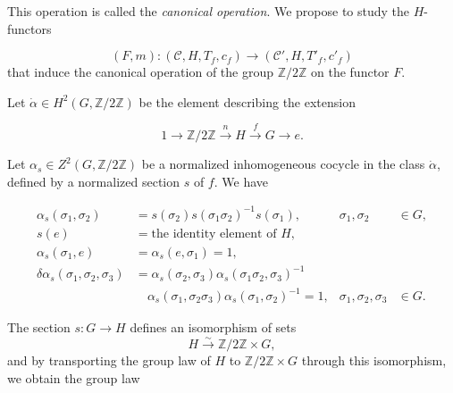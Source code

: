 %
This operation is called the \emph{canonical operation}. We propose to
study the $H$-functors

\begin{equation}
  (F,m)\colon(\mathcal C,H,T_f,c_f)
  \longrightarrow(\mathcal C',H,T'_f,c'_f)
  \tag{1.4.3.3}
\end{equation}
that induce the canonical operation of the group
$\mathbb Z/2\mathbb Z$ on the functor $F$.

Let $\dot\alpha\in H^2(G,\mathbb Z/2\mathbb Z)$ be the element
describing the extension

\begin{equation}
  1\longrightarrow\mathbb Z/2\mathbb Z
  \xrightarrow{n}H\xrightarrow{f}G\longrightarrow e.
  \tag{1.4.3.4}
\end{equation}

Let $\alpha_s\in Z^2(G,\mathbb Z/2\mathbb Z)$ be a normalized
inhomogeneous cocycle in the class $\dot\alpha$, defined by a normalized
section $s$ of $f$. We have

\begin{equation}
  \begin{aligned}
    \alpha_s(\sigma_1,\sigma_2)
      &=s(\sigma_2)s(\sigma_1\sigma_2)^{-1}s(\sigma_1),
      & \sigma_1,\sigma_2&\in G,\\
    s(e)&=\text{the identity element of }H,\\
    \alpha_s(\sigma_1,e)&=\alpha_s(e,\sigma_1)=1,\\
    \delta\alpha_s(\sigma_1,\sigma_2,\sigma_3)
      &=\alpha_s(\sigma_2,\sigma_3)
        \alpha_s(\sigma_1\sigma_2,\sigma_3)^{-1}\\
      &\quad{}\alpha_s(\sigma_1,\sigma_2\sigma_3)
        \alpha_s(\sigma_1,\sigma_2)^{-1}=1,
      & \sigma_1,\sigma_2,\sigma_3&\in G.
  \end{aligned}
  \tag{1.4.3.5}
\end{equation}

The section $s\colon G\to H$ defines an isomorphism of sets
\[
  H\xrightarrow{\sim}\mathbb Z/2\mathbb Z\times G,
\]
and by transporting the group law of $H$ to
$\mathbb Z/2\mathbb Z\times G$ through this isomorphism, we obtain the
group law

